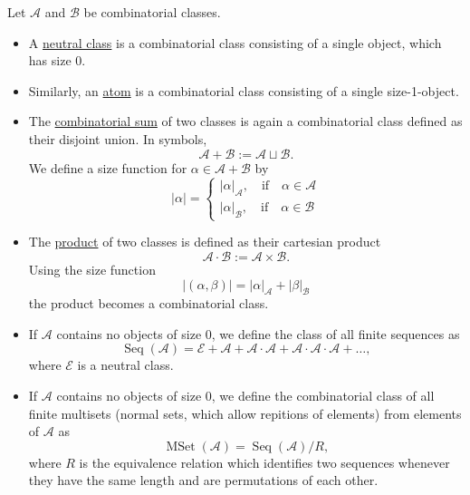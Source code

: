 Let $\mathcal{A}$ and $\mathcal{B}$ be combinatorial classes.
\begin{itemize}
    \item A \underline{neutral class} is a combinatorial class consisting of a single object, which has size 0.
    
    \item Similarly, an \underline{atom} is a combinatorial class consisting of a single size-1-object.
    
    \item The \underline{combinatorial sum} of two classes is again a combinatorial class defined as their disjoint union.
    In symbols, 
    \begin{equation*}
        \mathcal{A} + \mathcal{B} := \mathcal{A} \sqcup \mathcal{B}.
    \end{equation*}
    We define a size function for $\alpha \in \mathcal{A} + \mathcal{B}$ by
    \begin{equation*}
        |\alpha| = \begin{cases}
            |\alpha|_\mathcal{A}, \quad \textrm{if} \quad \alpha \in \mathcal{A} \\
            |\alpha|_\mathcal{B}, \quad \textrm{if} \quad \alpha \in \mathcal{B}
            \end{cases}
    \end{equation*}
    
    \item The \underline{product} of two classes is defined as their cartesian product
    \begin{equation*}
        \mathcal{A} \cdot \mathcal{B} := \mathcal{A} \times \mathcal{B}.
    \end{equation*}
    Using the size function
    \begin{equation*}
        |(\alpha, \beta)| = |\alpha|_\mathcal{A} + |\beta|_\mathcal{B}
    \end{equation*}
    the product becomes a combinatorial class.
    
    \item If $\mathcal{A}$ contains no objects of size $0$, we define the class of all finite sequences as
    \begin{equation*}
        \operatorname{Seq}(\mathcal{A}) = \mathcal{E} + \mathcal{A} + \mathcal{A} \cdot \mathcal{A} + \mathcal{A} \cdot \mathcal{A} \cdot \mathcal{A} + \dots, 
    \end{equation*}
    where $\mathcal{E}$ is a neutral class.
    
    \item If $\mathcal{A}$ contains no objects of size $0$, we define the combinatorial class of all finite multisets (normal sets, which allow repitions of elements) from elements of $\mathcal{A}$ as
    \begin{equation*}
        \operatorname{MSet}(\mathcal{A}) = \operatorname{Seq}(\mathcal{A}) / R, 
    \end{equation*}
    where $R$ is the equivalence relation which identifies two sequences whenever they have the same length and are permutations of each other.
\end{itemize}

